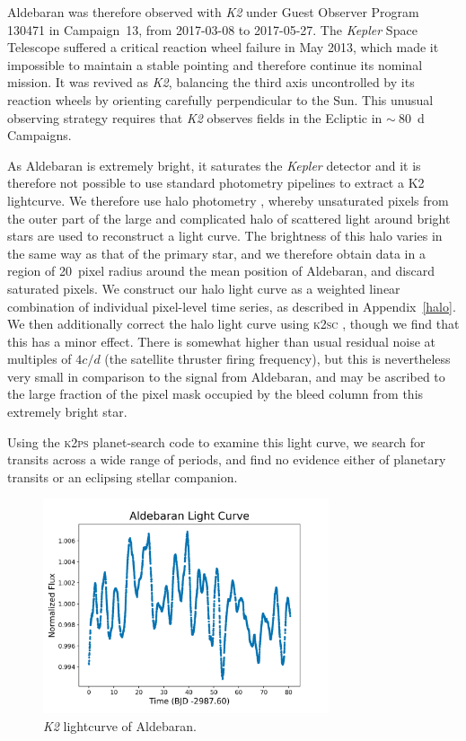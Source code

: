 \documentclass[modern]{aastex61}
\newcommand{\kepler}{\emph{Kepler}\xspace}
\newcommand{\ktwo}{\emph{K2}\xspace}
\begin{document}
Aldebaran was therefore observed with \ktwo under Guest Observer Program 130471 in Campaign~13, from 2017-03-08 to 2017-05-27. The \kepler Space Telescope \citep{2010sci...327..977b} %
suffered a critical reaction wheel failure in May 2013, which made it impossible to maintain a stable pointing and therefore continue its nominal mission. It was revived as \ktwo \citep{howell14}, balancing the third axis uncontrolled by its reaction wheels by orienting carefully perpendicular to the Sun. This unusual observing strategy requires that \ktwo observes fields in the Ecliptic in $\sim~80$~d Campaigns. 

As Aldebaran is extremely bright, it saturates the \kepler detector and it is therefore not possible to use standard photometry pipelines to extract a K2 lightcurve. We therefore use halo photometry \citep[as originally implemented in]{White2017}, whereby unsaturated pixels from the outer part of the large and complicated halo of scattered light around bright stars are used to reconstruct a light curve. The brightness of this halo varies in the same way as that of the primary star, and we therefore obtain data in a region of 20~pixel radius around the mean position of Aldebaran, and discard saturated pixels. We construct our halo light curve as a weighted linear combination of individual pixel-level time series, as described in Appendix~\ref{halo}. We then additionally correct the halo light curve using \textsc{k2sc} \citep{k2sc}, though we find that this has a minor effect. There is somewhat higher than usual residual noise at multiples of $4 c/d$ (the satellite thruster firing frequency), but this is nevertheless very small in comparison to the signal from Aldebaran, and may be ascribed to the large fraction of the pixel mask occupied by the bleed column from this extremely bright star.

Using the \textsc{k2ps} planet-search code \citep{k2ps,Pope2016} to examine this light curve, we search for transits across a wide range of periods, and find no evidence either of planetary transits or an eclipsing stellar companion.

\begin{figure}
\centering
\includegraphics[width=0.75\textwidth]{Aldebaran_lc.png}
\caption{\ktwo lightcurve of Aldebaran.}
\label{k2_lightcurve}
\end{figure}
\end{document}
